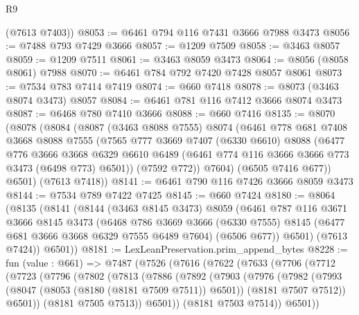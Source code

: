 \begin{lexlean}{R9}
\begin{coremodule}
      (@7613 @7403))
@8053 := @6461 @794 @116 @7431 @3666 @7988 @3473
@8056 := @7488 @793 @7429 @3666
@8057 := @1209 @7509
@8058 := @3463 @8057
@8059 := @1209 @7511
@8061 := @3463 @8059 @3473
@8064 := @8056 (@8058 @8061) @7988
@8070 := @6461 @784 @792 @7420 @7428 @8057 @8061
@8073 := @7534 @783 @7414 @7419
@8074 := @660 @7418
@8078 := @8073 (@3463 @8074 @3473) @8057
@8084 := @6461 @781 @116 @7412 @3666 @8074 @3473
@8087 := @6468 @780 @7410 @3666
@8088 := @660 @7416
@8135 := @8070
    (@8078
      (@8084
        (@8087
          (@3463 @8088 @7555)
          @8074
          (@6461
            @778
            @681
            @7408
            @3668
            @8088
            @7555
            (@7565
              @777
              @3669
              @7407
              (@6330 @6610)
              @8088
              (@6477
                @776
                @3666
                @3668
                @6329
                @6610
                @6489
                (@6461 @774 @116 @3666 @3666 @773 @3473 (@6498 @773) @6501))
              (@7592 @772))
            @7604)
          (@6505 @7416 @677))
        @6501)
      (@7613 @7418))
@8141 := @6461 @790 @116 @7426 @3666 @8059 @3473
@8144 := @7534 @789 @7422 @7425
@8145 := @660 @7424
@8180 := @8064
    (@8135
      (@8141
        (@8144
          (@3463 @8145 @3473)
          @8059
          (@6461
            @787
            @116
            @3671
            @3666
            @8145
            @3473
            (@6468
              @786
              @3669
              @3666
              (@6330 @7555)
              @8145
              (@6477 @681 @3666 @3668 @6329 @7555 @6489 @7604)
              (@6506 @677))
            @6501)
          (@7613 @7424))
        @6501))
@8181 := LexLeanPreservation.prim_append_bytes
@8228 := fun (value : @661) =>
  @7487
    (@7526
      (@7616
        (@7622
          (@7633
            (@7706
              (@7712
                (@7723
                  (@7796
                    (@7802
                      (@7813
                        (@7886
                          (@7892
                            (@7903
                              (@7976
                                (@7982
                                  (@7993
                                    (@8047 (@8053 (@8180 (@8181 @7509 @7511)) @6501))
                                    (@8181 @7507 @7512))
                                  @6501))
                              (@8181 @7505 @7513))
                            @6501))
                        (@8181 @7503 @7514))
                      @6501))

\end{coremodule}
\end{lexlean}
